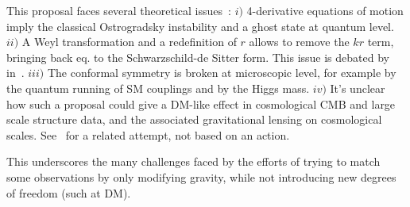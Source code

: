 This proposal faces several theoretical issues~\cite{ConformalGravity}:
$i)$ 4-derivative equations of motion imply the classical Ostrogradsky instability and a ghost state at quantum level.
$ii)$ A Weyl transformation and a redefinition of $r$ allows to remove the $kr$ term, bringing back eq. to the Schwarzschild-de Sitter form.
This issue is debated by  in~\cite{ConformalGravity}.
$iii)$ The conformal symmetry is broken at microscopic level, for example by the quantum running of SM couplings and by the Higgs mass.
$iv)$ It's unclear how such a proposal could give a DM-like effect in cosmological CMB and large scale structure data,
and the associated gravitational lensing on cosmological scales.
See~\cite{CottonGravity} for a related attempt, not based on an action.

This underscores the many challenges faced by the efforts of  trying to match some observations by only modifying gravity, 
while not introducing new degrees of freedom (such at DM).





